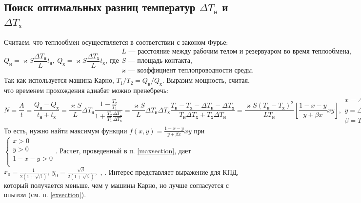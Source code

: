 \documentclass[a4paper]{article}
\begin{document}
\subsection{Поиск оптимальных разниц температур $\Delta T_\text{н}$ и $\Delta T_\text{х}$}
Считаем, что теплообмен осуществляется в соответствии с законом Фурье:
$$
Q_\text{н}=\varkappa S\frac{\Delta T_{\text{н}}}{L}t_{\text{н}},\ 
Q_\text{х}=\varkappa S\frac{\Delta T_{\text{х}}}{L}t_{\text{х}},\ 
\text{где}
\begin{array}{l}
L\text{~--- расстояние между рабочим телом и резервуаром во время теплообмена},\\
S\text{~--- площадь контакта},\\
\varkappa\text{~--- коэффициент теплопроводности среды.}
\end{array}
$$
Так как используется машина Карно,
$T_1/T_2=Q_{\text{н}}/Q_{\text{х}}$.\newline
Выразим мощность, считая, что временем прохождения адиабат можно пренебречь:
$$
N=\frac{A}{t}=\frac{Q_\text{н}-Q_\text{х}}{t_{\text{н}}+t_{\text{х}}}=
\frac{\varkappa S}{L}\Delta T_{\text{н}}\frac{1-\frac{T_2}{T_1}}{1+\frac{T_2}{T_1}\frac{\Delta T_{\text{н}}}{\Delta T_{\text{х}}}}=
\frac{\varkappa S}{L}\Delta T_{\text{н}}\Delta T_{\text{х}}\frac{T_{\text{н}}-T_{\text{х}}-\Delta T_{\text{н}}-\Delta T_{\text{х}}}{T_{\text{н}}\Delta T_{\text{х}}+T_{\text{х}}\Delta T_{\text{н}}}=
\frac{\varkappa S(T_{\text{н}}-T_{\text{х}})^2}{LT_{\text{н}}}\left[\frac{1-x-y}{y+\beta x}xy\right],
\begin{array}{lcr}
x=\Delta T_{\text{н}}/(T_{\text{н}}-T_{\text{х}}),\\
y=\Delta T_{\text{х}}/(T_{\text{н}}-T_{\text{х}}),\\
\beta= T_{\text{х}}/T_{\text{н}}.
\end{array}
$$
То есть, нужно найти максимум функции $f(x,y)=\frac{1-x-y}{y+\beta x}xy$ при $
\left\{
\begin{array}{l}
x>0\\
y>0\\
1-x-y>0\\
\end{array}	
\right.
.
$\newline
Расчет, проведенный в п. \ref{maxsection}, дает
$x_0=\frac{1}{2(1+\sqrt{\beta})},\ y_0=\frac{\sqrt{\beta}}{2(1+\sqrt{\beta})},$\newline
{\Large{},
\fbox{$N^{max}=\frac{\varkappa S}{4L}(\sqrt{T_{\text{н}}}-\sqrt{T_{\text{х}}})^2$}.}\newline
Интерес представляет выражение для КПД, который получается меньше, чем у машины Карно, но лучше согласуется с опытом (см. п. \ref{exsection}).
\newpage
\end{document}
